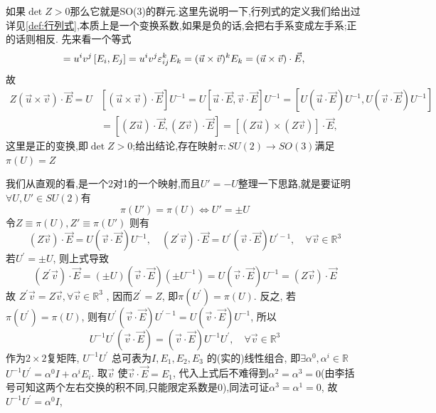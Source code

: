 \documentclass[../main.tex]{subfiles}
\begin{document}
如果$\det{Z} > 0$那么它就是SO(3)的群元.这里先说明一下,行列式的定义我们给出过详见\ref{def:行列式},本质上是一个变换系数,如果是负的话,会把右手系变成左手系;正的话则相反.
先来看一个等式
\begin{equation*}
[\vec{u} \cdot \vec{E}, \vec{v} \cdot \vec{E}]=u^{i} v^{j}\left[E_{i}, E_{j}\right]=u^{i} v^{j} \varepsilon_{i j}^{k} E_{k}=(\vec{u} \times \vec{v})^{k} E_{k}=(\vec{u} \times \vec{v}) \cdot \vec{E},\\
\end{equation*}
故
\begin{align*}
	Z(\vec{u} \times \vec{v}) \cdot \vec{E}=U & {[(\vec{u} \times \vec{v}) \cdot \vec{E}] U^{-1}=U[\vec{u} \cdot \vec{E}, \vec{v} \cdot \vec{E}] U^{-1}=\left[U(\vec{u} \cdot \vec{E}) U^{-1}, U(\vec{v} \cdot \vec{E}) U^{-1}\right] } \\
	                                          & =[(Z \vec{u}) \cdot \vec{E},(Z \vec{v}) \cdot \vec{E}]=[(Z \vec{u}) \times(Z \vec{v})] \cdot \vec{E},
\end{align*}
这里是正的变换,即$\det Z >0$;给出结论,存在映射$\pi : SU(2) \rightarrow SO(3)$满足$\pi(U) = Z$

我们从直观的看,是一个2对1的一个映射,而且$U' = -U$整理一下思路,就是要证明$\forall U,U' \in SU(2)$有$$\pi(U') = \pi(U)\Leftrightarrow U' = \pm U$$
令$Z \equiv \pi(U),Z' \equiv \pi(U')$
则有$$(Z \vec{v}) \cdot \vec{E}=U(\vec{v} \cdot \vec{E}) U^{-1}, \quad\left(Z^{\prime} \vec{v}\right) \cdot \vec{E}=U^{\prime}(\vec{v} \cdot \vec{E}) U^{\prime-1}, \quad \forall \vec{v} \in \mathbb{R}^{3} $$
若$  U^{\prime}= \pm U $, 则上式导致$$\left(Z^{\prime} \vec{v}\right) \cdot \vec{E}=( \pm U)(\vec{v} \cdot \vec{E})\left( \pm U^{-1}\right)=U(\vec{v} \cdot \vec{E}) U^{-1}=(Z \vec{v}) \cdot \vec{E}$$
故 $ Z^{\prime} \vec{v}=Z \vec{v}, \forall \vec{v} \in \mathbb{R}^{3}$ , 因而$  Z^{\prime}=Z $, 即$  \pi\left(U^{\prime}\right)=\pi(U) $. 反之, 若$  \pi\left(U^{\prime}\right)=\pi(U) $,
则有$  U^{\prime}(\vec{v} \cdot \vec{E}) U^{\prime-1}=U(\vec{v} \cdot \vec{E}) U^{-1} $, 所以$$U^{-1} U^{\prime}(\vec{v} \cdot \vec{E})=(\vec{v} \cdot \vec{E}) U^{-1} U^{\prime}, \quad \forall \vec{v} \in \mathbb{R}^{3}$$
作为$  2 \times 2  $复矩阵, $ U^{-1} U^{\prime} $ 总可表为$  I, E_{1}, E_{2}, E_{3} $ 的(实的)线性组合, 即$  \exists \alpha^{0}, \alpha^{i} \in \mathbb{R} $$  U^{-1} U^{\prime}=\alpha^{0} I+\alpha^{i} E_{i} $. 取$  \vec{v}  $
	使$  \vec{v} \cdot \vec{E}=E_{1} $, 代入上式后不难得到$  \alpha^{2}=\alpha^{3}=0 $(由李括号可知这两个左右交换的积不同,只能限定系数是0),同法可证$  \alpha^{3}=\alpha^{1}=0 $, 故$  U^{-1} U^{\prime}=\alpha^{0} I $,
\end{document}
